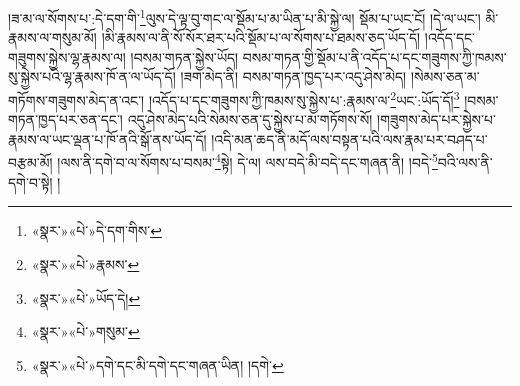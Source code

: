 །ཟ་མ་ལ་སོགས་པ་:དེ་དག་གི་\footnote{«སྣར་»«པེ་»དེ་དག་གིས་}ལུས་དེ་ལྟ་བུ་གང་ལ་སྡོམ་པ་མ་ཡིན་པ་མི་སྐྱེ་ལ། སྡོམ་པ་ཡང་ངོ། །དེ་ལ་ཡང་། མི་རྣམས་ལ་གསུམ་མོ། །མི་རྣམས་ལ་ནི་སོ་སོར་ཐར་པའི་སྡོམ་པ་ལ་སོགས་པ་ཐམས་ཅད་ཡོད་དོ། །འདོད་དང་གཟུགས་སྐྱེས་ལྷ་རྣམས་ལ། །བསམ་གཏན་སྐྱེས་ཡོད། བསམ་གཏན་གྱི་སྡོམ་པ་ནི་འདོད་པ་དང་གཟུགས་ཀྱི་ཁམས་སུ་སྐྱེས་པའི་ལྷ་རྣམས་ཁོ་ན་ལ་ཡོད་དོ། །ཟག་མེད་ནི། བསམ་གཏན་ཁྱད་པར་འདུ་ཤེས་མེད། །སེམས་ཅན་མ་གཏོགས་གཟུགས་མེད་ན་འང་། །འདོད་པ་དང་གཟུགས་ཀྱི་ཁམས་སུ་སྐྱེས་པ་:རྣམས་ལ་\footnote{«སྣར་»«པེ་»རྣམས་}ཡང་:ཡོད་དོ།\footnote{«སྣར་»«པེ་»ཡོད་དེ།} །བསམ་གཏན་ཁྱད་པར་ཅན་དང་། འདུ་ཤེས་མེད་པའི་སེམས་ཅན་དུ་སྐྱེས་པ་མ་གཏོགས་སོ། །གཟུགས་མེད་པར་སྐྱེས་པ་རྣམས་ལ་ཡང་ལྡན་པ་ཁོ་ནའི་སྒོ་ནས་ཡོད་དོ། །འདི་མན་ཆད་ནི་མདོ་ལས་བསྟན་པའི་ལས་རྣམ་པར་བཤད་པ་བརྩམ་མོ། །ལས་ནི་དགེ་བ་ལ་སོགས་པ་བསམ་\footnote{«སྣར་»«པེ་»གསུམ་}སྟེ། དེ་ལ། ལས་བདེ་མི་བདེ་དང་གཞན་ནི། །བདེ་\footnote{«སྣར་»«པེ་»དགེ་དང་མི་དགེ་དང་གཞན་ཡིན། །དགེ་}བའི་ལས་ནི་དགེ་བ་སྟེ། །
